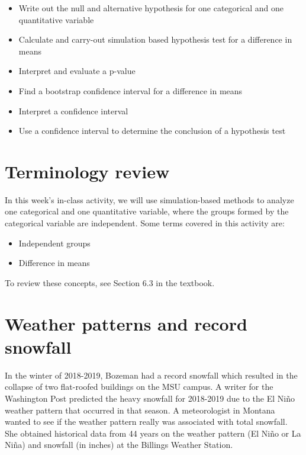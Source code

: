 \documentclass[
]{report}
\begin{document}
\begin{itemize}
\item
  Write out the null and alternative hypothesis for one categorical and one quantitative variable
\item
  Calculate and carry-out simulation based hypothesis test for a difference in means
\item
  Interpret and evaluate a p-value
\item
  Find a bootstrap confidence interval for a difference in means
\item
  Interpret a confidence interval
\item
  Use a confidence interval to determine the conclusion of a hypothesis test
\end{itemize}

\hypertarget{terminology-review}{%
\section{Terminology review}\label{terminology-review}}

In this week's in-class activity, we will use simulation-based methods to analyze one categorical and one quantitative variable, where the groups formed by the categorical variable are independent. Some terms covered in this activity are:

\begin{itemize}
\item
  Independent groups
\item
  Difference in means
\end{itemize}

To review these concepts, see Section 6.3 in the textbook.

\hypertarget{weather-patterns-and-record-snowfall}{%
\section{Weather patterns and record snowfall}\label{weather-patterns-and-record-snowfall}}

In the winter of 2018-2019, Bozeman had a record snowfall which resulted in the collapse of two flat-roofed buildings on the MSU campus. A writer for the Washington Post predicted the heavy snowfall for 2018-2019 due to the El Ni\~{n}o weather pattern that occurred in that season. A meteorologist in Montana wanted to see if the weather pattern really was associated with total snowfall. She obtained historical data from 44 years on the weather pattern (El Ni\~{n}o or La Ni\~{n}a) and snowfall (in inches) at the Billings Weather Station.
\end{document}
